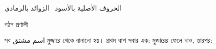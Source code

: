 \vspace{0.4cm}

\begin{center}
  {\arabicfont \color{gray} \small
    \textarabic{الحروف الأصلية بالأسود \textbullet\ الزوائد بالرمادي}
  }
\end{center}

\newpage

\begin{center}
  {\Large \color{titlegreen} গঠন প্রণালী}
\end{center}

\noindent সব {\arabicfont \textarabic{اسم مشتق}} মুজারে থেকে বানানো হয়।
প্রথম ধাপ সবার এক: মুজারের {\arabicfont \textarabic{}} ফেলে দাও, তারপর:

\vspace{0.2cm}

\begingroup
\renewcommand{\tabularxcolumn}[1]{m{#1}}
\setlength{\arrayrulewidth}{0.5pt}
\setlength{\tabcolsep}{4pt}
\renewcommand{\arraystretch}{1.9}

